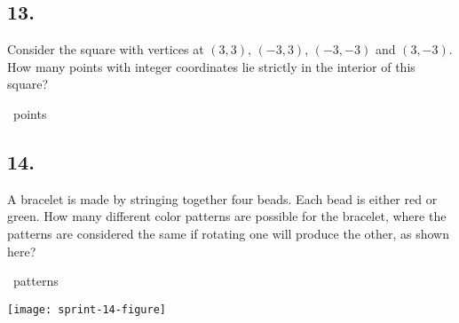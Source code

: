 \documentclass[12pt]{article}
\begin{document}
\subsection*{13.}
Consider the square with vertices at $(3,3)$, $(-3,3)$, $(-3,-3)$ and $(3,-3)$. How many points with integer coordinates lie strictly in the interior of this square?

\fbox{\phantom{ANSWER}}~points

\begin{answer}
%
\end{answer}


\subsection*{14.}
A bracelet is made by stringing together four beads. Each bead is either red or green. How many different color patterns are possible for the bracelet, where the patterns are considered the same if rotating one will produce the other, as shown here? 

\fbox{\phantom{ANSWER}}~patterns

\begin{minipagex}[b]{\linewidth}
\centering
\texttt{[image: sprint-14-figure]}
\end{minipagex}
\end{document}
